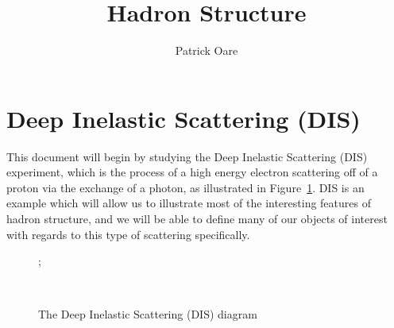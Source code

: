 \documentclass[11pt, oneside]{article}   	%
\title{Hadron Structure}
\author{Patrick Oare}
\date{}							%
\theoremstyle{definition}
\begin{document}
\maketitle

\section{Deep Inelastic Scattering (DIS)}

This document will begin by studying the Deep Inelastic Scattering (DIS) experiment, which is the process of a high energy electron scattering 
off of a proton via the exchange of a photon, as illustrated in Figure~\ref{fig:dis}. DIS is an example which will allow us to illustrate most of the 
interesting features of hadron structure, and we will be able to define many of our objects of interest with regards to this type of scattering 
specifically. 

\begin{figure}[H]
\centering
{};
\caption{The Deep Inelastic Scattering (DIS) diagram}~
\label{fig:dis}
\end{figure}
\end{document}

